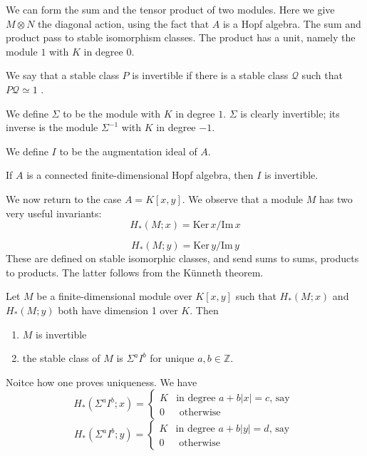 \documentclass[../main]{subfiles}
\begin{document}
    We can form the sum and the tensor product of two modules. Here we give $M\otimes N$ the diagonal action, using the fact that $A$ is a Hopf algebra. The sum and product pass to stable isomorphism classes. The product has a unit, namely the module $1$ with $K$ in degree $0$.
    
    We say that a stable class $P$ is invertible if there is a stable class $\mathcal{Q}$ such that $P\mathcal{Q}\simeq 1$ . 
    
    We define $\Sigma$ to be the module with $K$ in degree $1$. $\Sigma$ is clearly invertible; its inverse is the module $\Sigma^{-1}$ with $K$ in degree $-1$. 
    
    We define $I$ to be the augmentation ideal of $A$.
    
    \begin{lemma} \label{lem:p3ch16.2}
     If $A$ is a connected finite-dimensional Hopf algebra, then $I$ is invertible. 
    \end{lemma}
    We now return to the case $A=K[x, y]$. We observe that a module $M$ has two very useful invariants:
    \[ H_{\ast}(M;x)= \mathrm{Ker} \, x/\mathrm{Im} \, x \]
    
    \[ H_{\ast}(M;y)= \mathrm{Ker} \, y/\mathrm{Im} \, y \]
    These are defined on stable isomorphic classes, and send sums to sums, products to products. The latter follows from the Künneth theorem. 
    
    \begin{theorem}\label{thm:p3ch16.3}
    Let $M$ be a finite-dimensional module over $K[x, y]$ such that $H_{\ast}(M;x)$ and $H_{\ast}(M;y)$ both have dimension 1 over $K$. Then
    \begin{enumerate}
        \item[(i)] $M$ is invertible
        \item[(ii)] the stable class of $M$ is $\Sigma^{a}I^{b}$ for unique $a, b\in \mathbb Z$. 
    \end{enumerate}
    \end{theorem}
    Noitce how one proves uniqueness. We have
    \[ H_{\ast}(\Sigma^{a}I^{b};x)= \begin{cases}
        K &\text{in degree $a+b|x|=c$, say } \\
        0 &\text{ otherwise}
    \end{cases} \]
    \[ H_{\ast}(\Sigma^{a}I^{b};y)= \begin{cases}
        K &\text{in degree $a+b|y|=d$, say } \\
        0 &\text{ otherwise}
    \end{cases} \]
    
\end{document}
